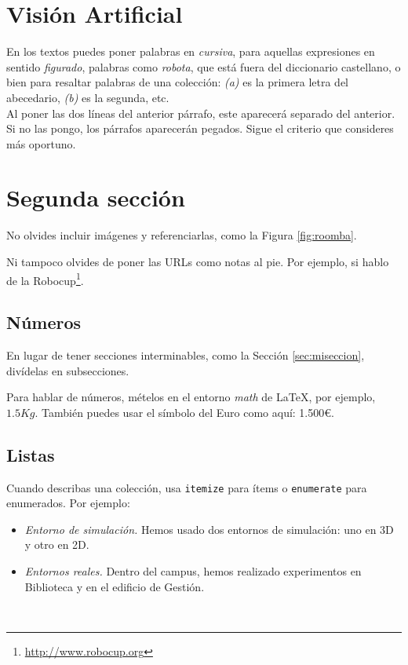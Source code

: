 \section{Visión Artificial}
\label{sec:VA} 



En los textos puedes poner palabras en \textit{cursiva}, para aquellas expresiones en sentido \textit{figurado}, palabras como \textit{robota}, que está fuera del diccionario castellano, o bien para resaltar palabras de una colección: \textit{(a)} es la primera letra del abecedario, \textit{(b)} es la segunda, etc.\\

Al poner las dos líneas del anterior párrafo, este aparecerá separado del anterior. Si no las pongo, los párrafos aparecerán pegados. Sigue el criterio que consideres más oportuno.

\section{Segunda sección}
\label{sec:segundaseccion}

No olvides incluir imágenes y referenciarlas, como la Figura \ref{fig:roomba}.

Ni tampoco olvides de poner las URLs como notas al pie. Por ejemplo, si hablo de la Robocup\footnote{\url{http://www.robocup.org}}.

\subsection{Números}
\label{sec:subseccion}

En lugar de tener secciones interminables, como la Sección \ref{sec:miseccion}, divídelas en subsecciones.

Para hablar de números, mételos en el entorno \textit{math} de \LaTeX, por ejemplo, $1.5Kg$. También puedes usar el símbolo del Euro como aquí: 1.500\euro.

\subsection{Listas}

Cuando describas una colección, usa \texttt{itemize} para ítems o \texttt{enumerate} para enumerados. Por ejemplo:

\begin{itemize}
 \item \textit{Entorno de simulación.} Hemos usado dos entornos de simulación: uno en 3D y otro en 2D.
 \item \textit{Entornos reales.} Dentro del campus, hemos realizado experimentos en Biblioteca y en el edificio de Gestión.
\end{itemize}\

